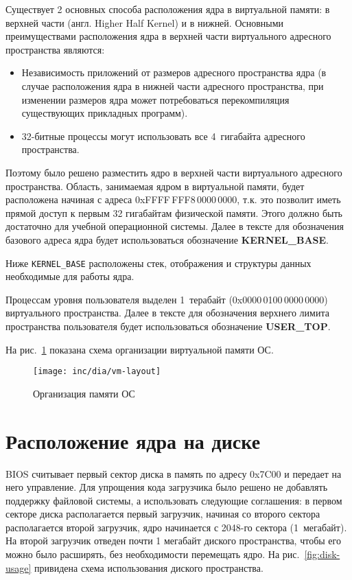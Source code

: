 Существует 2 основных способа расположения ядра в виртуальной памяти: в верхней части (англ. Higher Half Kernel)
и в нижней. Основными преимуществами расположения ядра в верхней части виртуального адресного пространства являются:
\begin{itemize}
\item Независимость приложений от размеров адресного пространства ядра (в случае расположения ядра в нижней части
	адресного пространства, при изменении размеров ядра может потребоваться перекомпиляция существующих
	прикладных программ).
\item 32-битные процессы могут использовать все 4~гигабайта адресного пространства.
\end{itemize}

Поэтому было решено разместить ядро в верхней части виртуального адресного пространства. Область, занимаемая
ядром в виртуальной памяти, будет расположена начиная с адреса 0xFFFF\,FFF8\,0000\,0000, т.к. это
позволит иметь прямой доступ к первым 32 гигабайтам физической памяти. Этого должно быть достаточно для
учебной операционной системы. Далее в тексте для обозначения базового адреса ядра будет использоваться
обозначение \textbf{KERNEL\_BASE}.

Ниже \texttt{KERNEL\_BASE} расположены стек, отображения и структуры данных необходимые для
работы ядра.

Процессам уровня пользователя выделен 1~терабайт (0x0000\,0100\,0000\,0000) виртуального пространства.
Далее в тексте для обозначения верхнего лимита пространства пользователя будет использоваться
обозначение \textbf{USER\_TOP}.

На рис.~\ref{fig:vm-layout} показана схема организации виртуальной памяти ОС.
\begin{figure}[ht!]
  \centering
  \texttt{[image: inc/dia/vm-layout]}
  \caption{Организация памяти ОС}
  \label{fig:vm-layout}
\end{figure}

\section{Расположение ядра на диске}
BIOS считывает первый сектор диска в память по адресу 0x7C00 и передает на него управление.
Для упрощения кода загрузчика было решено не добавлять поддержку файловой системы, а
использовать следующие соглашения: в первом секторе диска располагается первый
загрузчик, начиная со второго сектора располагается второй загрузчик, ядро начинается
с 2048-го сектора (1~мегабайт). На второй загрузчик отведен почти
1 мегабайт диского пространства, чтобы его можно было расширять, без необходимости перемещать
ядро. На рис.~\ref{fig:disk-usage} привидена схема использования диского пространства.

